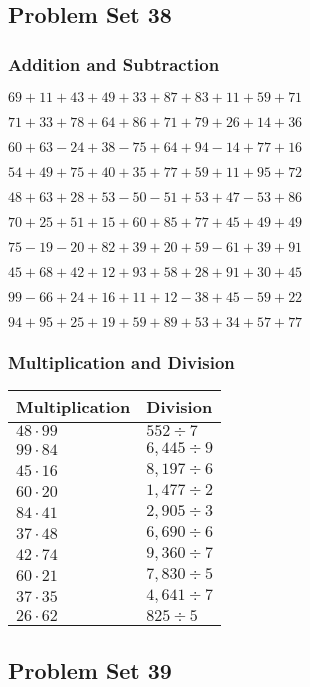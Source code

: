 \hypertarget{problem-set-38-1}{%
\subsection{Problem Set 38}\label{problem-set-38-1}}

\hypertarget{addition-and-subtraction-78}{%
\subsubsection{Addition and
Subtraction}\label{addition-and-subtraction-78}}

\(69+11+43+49+33+87+83+11+59+ 71\)

\(71+33+78+64+86+71+79+26+14+36\)

\(60+63-24+38-75+64+94-14+77+16\)

\(54+49+75+40+35+77+59+11+95+72\)

\(48+63+28+53-50-51+53+47-53+86\)

\(70+25+51+15+60+85+77+45+49+49\)

\(75-19-20+82+39+20+59-61+39+91\)

\(45+68+42+12+93+58+28+91+30+45\)

\(99-66+24+16+11+12-38+45-59+22\)

\(94+95+25+19+59+89+53+34+57+77\)

\hypertarget{multiplication-and-division-78}{%
\subsubsection{Multiplication and
Division}\label{multiplication-and-division-78}}

\begin{longtable}[]{@{}ll@{}}
\toprule
Multiplication & Division\tabularnewline
\midrule
\endhead
\(48\cdot99\) & \(552÷7\)\tabularnewline
\(99\cdot84\) & \(6,445÷9\)\tabularnewline
\(45\cdot16\) & \(8,197÷6\)\tabularnewline
\(60\cdot20\) & \(1,477÷2\)\tabularnewline
\(84\cdot41\) & \(2,905÷3\)\tabularnewline
\(37\cdot48\) & \(6,690÷6\)\tabularnewline
\(42\cdot74\) & \(9,360÷7\)\tabularnewline
\(60\cdot21\) & \(7,830÷5\)\tabularnewline
\(37\cdot35\) & \(4,641÷7\)\tabularnewline
\(26\cdot62\) & \(825÷5\)\tabularnewline
\bottomrule
\end{longtable}

\hypertarget{problem-set-39-1}{%
\subsection{Problem Set 39}\label{problem-set-39-1}}

